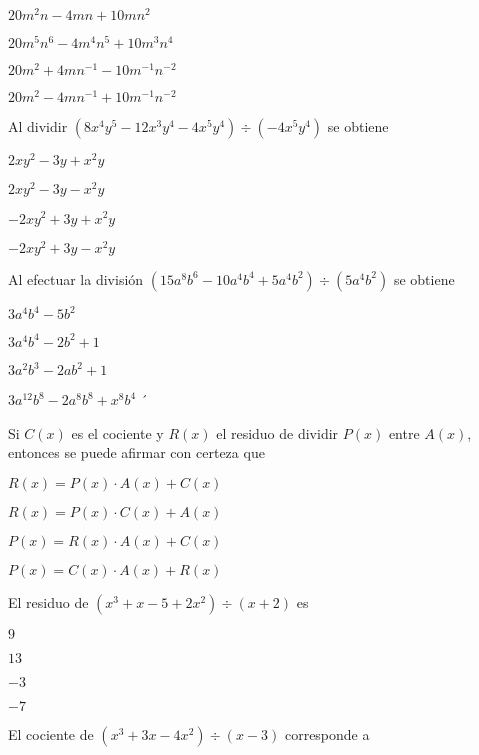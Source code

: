 \documentclass[12pt, fleqn]{article}
\begin{document}
\benu
\item[] \opc $20m^2n-4mn+10mn^2$
\item[] \opc $20m^5n^6-4m^4n^5+10m^3n^4$
\item[] \opc $20m^2+4mn^{-1}-10m^{-1}n^{-2}$
\item[] \opc $20m^2-4mn^{-1}+10m^{-1}n^{-2}$
\eenu
\vs

\item Al dividir $(8x^4y^5-12x^3y^4-4x^5y^4)\div (-4x^5y^4)$ se obtiene
\vp

\benu
\item[] \opc $2xy^2-3y+x^2y$
\item[] \opc $2xy^2-3y-x^2y$
\item[] \opc $-2xy^2+3y+x^2y$
\item[] \opc $-2xy^2+3y-x^2y$
\eenu
\vp

\item Al efectuar la división $(15a^8b^6-10a^4b^4+5a^4b^2)\div (5a^4b^2)$ se obtiene
\vp

\benu
\item[] \opc $3a^4b^4-5b^2$
\item[] \opc $3a^4b^4-2b^2+1$
\item[] \opc $3a^2b^3-2ab^2+1$
\item[] \opc $3a^{12}b^8-2a^8b^8+x^8b^4$
\eenu
\vspace{-4mm}
´
\item Si $C(x)$ es el cociente y $R(x)$ el residuo de dividir $P(x)$ entre $A(x)$, entonces se puede afirmar con certeza que \vp

\benu
\item[] \opc $R(x)=P(x)\cdot A(x)+C(x)$
\item[] \opc $R(x)=P(x)\cdot C(x)+A(x)$
\item[] \opc $P(x)=R(x)\cdot A(x)+C(x)$
\item[] \opc $P(x)=C(x)\cdot A(x)+R(x)$
\eenu
\vp

\item El residuo de $(x^3+x-5+2x^2)\div(x+2)$ es
\vp

\benu
\item[] \opc $9$
\item[] \opc $13$
\item[] \opc $-3$
\item[] \opc $-7$
\eenu

\pagebreak

\item El cociente de $(x^3+3x-4x^2)\div(x-3)$ corresponde a \vp
\end{document}
